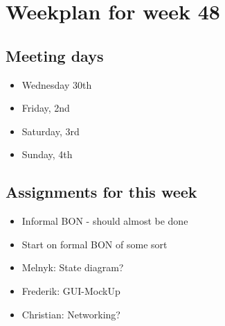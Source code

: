 \section{Weekplan for week 48}
\subsection{Meeting days}
\begin{itemize}
\item Wednesday 30th
\item Friday, 2nd
\item Saturday, 3rd
\item Sunday, 4th
\end{itemize}

\subsection{Assignments for this week}
\begin{itemize}
\item Informal BON - should almost be done
\item Start on formal BON of some sort
\item Melnyk: State diagram?
\item Frederik: GUI-MockUp
\item Christian: Networking?
\end{itemize}